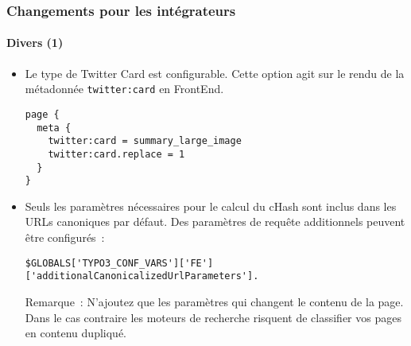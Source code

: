 \begin{frame}[fragile]
	\frametitle{Changements pour les intégrateurs}
	\framesubtitle{Divers (1)}

	\lstset{basicstyle=\tiny\ttfamily}

	\begin{itemize}

		\item Le type de Twitter Card est configurable.
			Cette option agit sur le rendu de la métadonnée \texttt{twitter:card} en FrontEnd.

\begin{lstlisting}
page {
  meta {
    twitter:card = summary_large_image
    twitter:card.replace = 1
  }
}
\end{lstlisting}

		\item Seuls les paramètres nécessaires pour le calcul du cHash sont inclus dans les URLs canoniques par défaut.
			Des paramètres de requête additionnels peuvent être configurés~:

\begin{lstlisting}
$GLOBALS['TYPO3_CONF_VARS']['FE']['additionalCanonicalizedUrlParameters'].
\end{lstlisting}

		\smaller
			Remarque~: N'ajoutez que les paramètres qui changent le contenu de la page. Dans le cas contraire les
			moteurs de recherche risquent de classifier vos pages en contenu dupliqué.
		\normalsize

	\end{itemize}

\end{frame}


